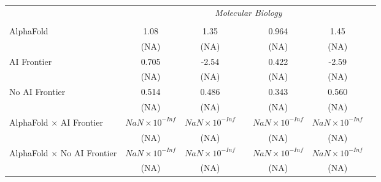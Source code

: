 \begin{tabular}{lcccccc}
 & \multicolumn{6}{c}{\textit{Molecular Biology}} \\ \\
   AlphaFold                                                                  & 1.08                   & 1.35                   &                        & 0.964                  & 1.45                   &   \\   
                                                                              & (NA)                   & (NA)                   &                        & (NA)                   & (NA)                   &   \\   
   AI Frontier                                                                & 0.705                  & -2.54                  &                        & 0.422                  & -2.59                  &   \\   
                                                                              & (NA)                   & (NA)                   &                        & (NA)                   & (NA)                   &   \\   
   No AI Frontier                                                             & 0.514                  & 0.486                  &                        & 0.343                  & 0.560                  &   \\   
                                                                              & (NA)                   & (NA)                   &                        & (NA)                   & (NA)                   &   \\   
   AlphaFold $\times$ AI Frontier                                             & $NaN\times 10^{-Inf}$  & $NaN\times 10^{-Inf}$  &                        & $NaN\times 10^{-Inf}$  & $NaN\times 10^{-Inf}$  &   \\   
                                                                              & (NA)                   & (NA)                   &                        & (NA)                   & (NA)                   &   \\   
   AlphaFold $\times$ No AI Frontier                                          & $NaN\times 10^{-Inf}$  & $NaN\times 10^{-Inf}$  &                        & $NaN\times 10^{-Inf}$  & $NaN\times 10^{-Inf}$  &   \\   
                                                                              & (NA)                   & (NA)                   &                        & (NA)                   & (NA)                   &   \\   

\end{tabular}
